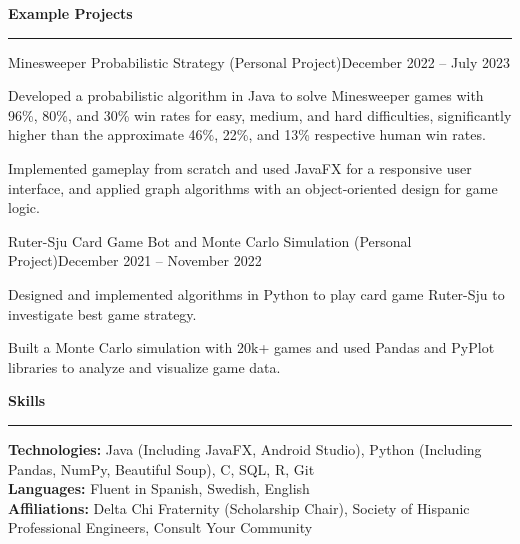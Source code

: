 \documentclass{article}
\newcommand{\horizontal}{\vspace{2pt}\hrule}
\newcommand{\sectitle}[1]{\vspace{2pt} \textbf{\large #1} \horizontal}
\newcommand{\skill}[2]{\textbf{#1:} #2}
\begin{document}
\begin{flushleft}
\sectitle{Example Projects}

    \vspace{3pt}

    \begin{subexperience}{Minesweeper Probabilistic Strategy (Personal Project)}{December 2022 -- July 2023}
        \item Developed a probabilistic algorithm in Java to solve Minesweeper games with 96\%, 80\%, and 30\% win rates for easy, medium, and hard difficulties, significantly higher than the approximate 46\%, 22\%, and 13\% respective human win rates.
        \item Implemented gameplay from scratch and used JavaFX for a responsive user interface, and applied graph algorithms with an object-oriented design for game logic.
    \end{subexperience}

    \begin{subexperience}{Ruter-Sju Card Game Bot and Monte Carlo Simulation (Personal Project)}{December 2021 -- November 2022}
        \item Designed and implemented algorithms in Python to play card game Ruter-Sju to investigate best game strategy.
        \item Built a Monte Carlo simulation with 20k+ games and used Pandas and PyPlot libraries to analyze and visualize game data.
    \end{subexperience}

\sectitle{Skills}

    \vspace{3pt}
    \skill{Technologies}{Java (Including JavaFX, Android Studio), Python (Including Pandas, NumPy, Beautiful Soup), C, SQL, R, Git} \\
    \skill{Languages}{Fluent in Spanish, Swedish, English} \\
    \skill{Affiliations}{Delta Chi Fraternity (Scholarship Chair), Society of Hispanic Professional Engineers, Consult Your Community}

\end{flushleft}
\end{document}
